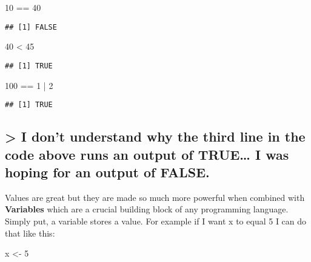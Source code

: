 \documentclass[
]{article}
\newenvironment{Shaded}{\begin{snugshade}}{\end{snugshade}}
\newcommand{\DecValTok}[1]{\textcolor[rgb]{0.00,0.00,0.81}{#1}}
\newcommand{\NormalTok}[1]{#1}
\newcommand{\OtherTok}[1]{\textcolor[rgb]{0.56,0.35,0.01}{#1}}
\newcommand{\SpecialCharTok}[1]{\textcolor[rgb]{0.00,0.00,0.00}{#1}}
\begin{document}
\begin{Shaded}
\begin{Highlighting}[]
\DecValTok{10} \SpecialCharTok{==} \DecValTok{40}
\end{Highlighting}
\end{Shaded}

\begin{verbatim}
## [1] FALSE
\end{verbatim}

\begin{Shaded}
\begin{Highlighting}[]
\DecValTok{40} \SpecialCharTok{\textless{}} \DecValTok{45}
\end{Highlighting}
\end{Shaded}

\begin{verbatim}
## [1] TRUE
\end{verbatim}

\begin{Shaded}
\begin{Highlighting}[]
\DecValTok{100} \SpecialCharTok{==} \DecValTok{1} \SpecialCharTok{|} \DecValTok{2}
\end{Highlighting}
\end{Shaded}

\begin{verbatim}
## [1] TRUE
\end{verbatim}

\hypertarget{i-dont-understand-why-the-third-line-in-the-code-above-runs-an-output-of-true-i-was-hoping-for-an-output-of-false.}{%
\subsection{\textgreater{} I don't understand why the third line in the
code above runs an output of TRUE\ldots{} I was hoping for an output of
FALSE.}\label{i-dont-understand-why-the-third-line-in-the-code-above-runs-an-output-of-true-i-was-hoping-for-an-output-of-false.}}

Values are great but they are made so much more powerful when combined
with \textbf{Variables} which are a crucial building block of any
programming language. Simply put, a variable stores a value. For example
if I want x to equal 5 I can do that like this:

\begin{Shaded}
\begin{Highlighting}[]
\NormalTok{x }\OtherTok{\textless{}{-}} \DecValTok{5}
\end{Highlighting}
\end{Shaded}
\end{document}
